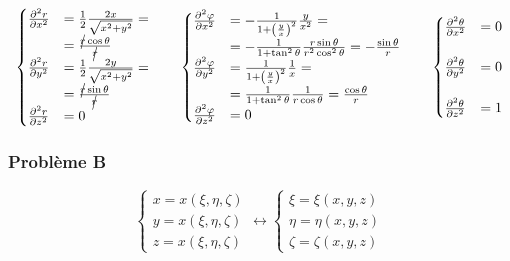 \documentclass
[
a4paper,                      %
twoside,					  %
12pt,                         %
abstract,		      %
fleqn,                        %
]
{scrartcl} %
\begin{document}
\begin{description}
\begin{equation}
\begin{cases}
\frac{\partial^{2} r}{\partial x^{2}}&=\frac{1}{2}\frac{2x}{\sqrt{x^{2}+y^{2}}}=\\&=\frac{\cancel{r}\cos{\theta}}{\cancel{r}}\\
\frac{\partial^{2} r}{\partial y^{2}}&=\frac{1}{2}\frac{2y}{\sqrt{x^{2}+y^{2}}}=\\&=\frac{\cancel{r}\sin{\theta}}{\cancel{r}}\\
\frac{\partial^{2} r}{\partial z^{2}}&=0\\
\end{cases}\qquad\begin{cases}
\frac{\partial^{2} \varphi}{\partial x^{2}}&=-\frac{1}{1+\left(\frac{y}{x}\right)^{2}}\frac{y}{x^{2}}=\\&=-\frac{1}{1+\tan^{2}{\theta}}\frac{r\sin{\theta}}{r^{2}\cos^{2}{\theta}}=-\frac{\sin{\theta}}{r}\\
\frac{\partial^{2} \varphi}{\partial y^{2}}&=\frac{1}{1+\left(\frac{y}{x}\right)^{2}}\frac{1}{x}=\\&=\frac{1}{1+\tan^{2}{\theta}}\frac{1}{r\cos{\theta}}=\frac{\cos{\theta}}{r}\\
\frac{\partial^{2} \varphi}{\partial z^{2}}&=0\\
\end{cases}\qquad\begin{cases}
\frac{\partial^{2} \theta}{\partial x^{2}}&=0\\&\\
\frac{\partial^{2} \theta}{\partial y^{2}}&=0\\&\\
\frac{\partial^{2} \theta}{\partial z^{2}}&=1\\
\end{cases}
\end{equation}

\end{description}

\subsubsection{Probl\`eme B}

\begin{equation}
\begin{cases}
x=x\left(\xi,\eta,\zeta\right)\\
y=x\left(\xi,\eta,\zeta\right)\\
z=x\left(\xi,\eta,\zeta\right)
\end{cases}\longleftrightarrow\begin{cases}
\xi=\xi\left(x,y,z\right)\\
\eta=\eta\left(x,y,z\right)\\
\zeta=\zeta\left(x,y,z\right)
\end{cases}
\end{equation}
\end{document}
